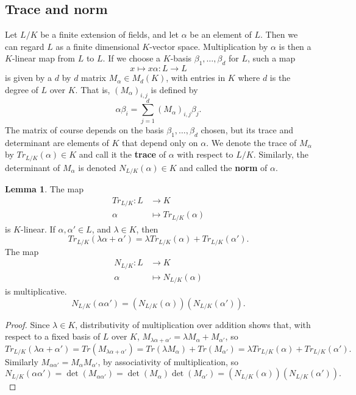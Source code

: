 \documentclass{article}
\newcommand{\rb}[1]{\left( #1 \right)}
\theoremstyle{definition}\newtheorem{definition}{Definition}[subsection]
\theoremstyle{definition}\newtheorem{remark}[definition]{Remark}
\theoremstyle{definition}\newtheorem*{example}{Example}
\theoremstyle{definition}\newtheorem*{note}{Note}
\newtheorem{lemma}[definition]{Lemma}
\begin{document}
\subsection{Trace and norm}

Let $ L / K $ be a finite extension of fields, and let $ \alpha $ be an element of $ L $. Then we can regard $ L $ as a finite dimensional $ K $-vector space. Multiplication by $ \alpha $ is then a $ K $-linear map from $ L $ to $ L $. If we choose a $ K $-basis $ \beta_1, \dots, \beta_d $ for $ L $, such a map
$$ x \mapsto x\alpha : L \to L $$
is given by a $ d $ by $ d $ matrix $ M_\alpha \in M_d\rb{K} $, with entries in $ K $ where $ d $ is the degree of $ L $ over $ K $. That is, $ \rb{M_\alpha}_{i, j} $ is defined by
$$ \alpha\beta_i = \sum_{j = 1}^d \rb{M_\alpha}_{i, j}\beta_j. $$
The matrix of course depends on the basis $ \beta_1, \dots, \beta_d $ chosen, but its trace and determinant are elements of $ K $ that depend only on $ \alpha $. We denote the trace of $ M_\alpha $ by $ Tr_{L / K}\rb{\alpha} \in K $ and call it the \textbf{trace} of $ \alpha $ with respect to $ L / K $. Similarly, the determinant of $ M_\alpha $ is denoted $ N_{L / K}\rb{\alpha} \in K $ and called the \textbf{norm} of $ \alpha $.

\begin{lemma}
The map
\begin{align*}
Tr_{L / K} : L & \to K \\
\alpha & \mapsto Tr_{L / K}\rb{\alpha}
\end{align*}
is $ K $-linear. If $ \alpha, \alpha' \in L $, and $ \lambda \in K $, then
$$ Tr_{L / K}\rb{\lambda\alpha + \alpha'} = \lambda Tr_{L / K}\rb{\alpha} + Tr_{L / K}\rb{\alpha'}. $$
The map
\begin{align*}
N_{L / K} : L & \to K \\
\alpha & \mapsto N_{L / K}\rb{\alpha}
\end{align*}
is multiplicative.
$$ N_{L / K}\rb{\alpha\alpha'} = \rb{N_{L / K}\rb{\alpha}}\rb{N_{L / K}\rb{\alpha'}}. $$
\end{lemma}

\begin{proof}
Since $ \lambda \in K $, distributivity of multiplication over addition shows that, with respect to a fixed basis of $ L $ over $ K $, $ M_{\lambda\alpha + \alpha'} = \lambda M_\alpha + M_{\alpha'} $, so
$$ Tr_{L / K}\rb{\lambda\alpha + \alpha'} = Tr\rb{M_{\lambda\alpha + \alpha'}} = Tr\rb{\lambda M_\alpha} + Tr\rb{M_{\alpha'}} = \lambda Tr_{L / K}\rb{\alpha} + Tr_{L / K}\rb{\alpha'}. $$
Similarly $ M_{\alpha\alpha'} = M_\alpha M_{\alpha'} $, by associativity of multiplication, so
$$ N_{L / K}\rb{\alpha\alpha'} = \det\rb{M_{\alpha\alpha'}} = \det\rb{M_\alpha}\det\rb{M_{\alpha'}} = \rb{N_{L / K}\rb{\alpha}}\rb{N_{L / K}\rb{\alpha'}}. $$
\end{proof}
\end{document}
